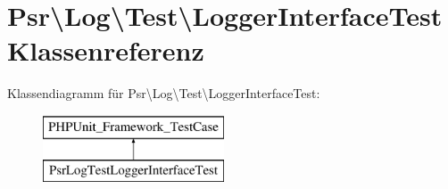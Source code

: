 \hypertarget{class_psr_1_1_log_1_1_test_1_1_logger_interface_test}{}\section{Psr\textbackslash{}Log\textbackslash{}Test\textbackslash{}Logger\+Interface\+Test Klassenreferenz}
\label{class_psr_1_1_log_1_1_test_1_1_logger_interface_test}
Klassendiagramm für Psr\textbackslash{}Log\textbackslash{}Test\textbackslash{}Logger\+Interface\+Test\+:\begin{figure}[H]
\begin{center}
\leavevmode
\includegraphics[height=2.000000cm]{class_psr_1_1_log_1_1_test_1_1_logger_interface_test}
\end{center}
\end{figure}
